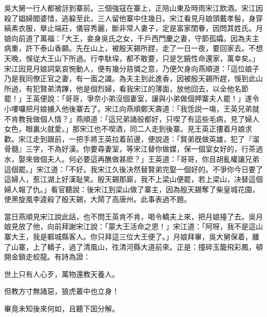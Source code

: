 吳大舅一行人都被㧱到寨前。三個強寇在寨上，正陪山東及時雨宋江飲酒。宋江因殺了娼婦閻婆惜，逃躱至此，三人留他寨中住幾日。宋江看見月娘頭戴孝髻，身穿縞素衣服，擧止端莊，儀容秀麗，斷非常人妻子，定是富家閨眷，因問其姓氏。月娘向前道了萬福：「大王，妾身吳氏之女，千戶西門慶之妻，守節孤孀。因為夫主病重，許下泰山香願。先在山上，被殷天錫所趕，走了一日一夜，要回家去。不想天晚，悞従大王山下所過。行李馱垜，都不敢要，只是乞饒性命還家，萬幸矣。」宋江因見月娘詞氣哀惋動人，便有幾分慈憐之意，乃便欠身向燕順道：「這位娘子乃是我同僚正官之妻，有一面之識。為夫主到此進香，因被殷天錫所趕，悞到此山所過，有犯賢弟清蹕，他是個烈婦，看我宋江的薄面，放他回去，以全他名節罷！」王英便說：「哥哥，爭奈小弟沒個妻室，讓與小弟做個押寨夫人罷！」遂令小嘍囉把月娘擄入他後寨去了。宋江向燕順鄭天壽道：「我恁説一塲，王英兄弟就不肯教我做個人情？」燕順道：「這兄弟諸般都好，只喫了有這些毛病，見了婦人女色，眼裏火就愛。」那宋江也不喫酒，同二人走到後寨。見王英正摟着月娘求歡。宋江走到跟前，一把手將王英拉着前邊，便說道：「賢弟旣做英雄，犯了『溜骨髓』三字，不為好漢。你要尋妻室，等宋江替你做媒，保一個室女好的，行茶過水，娶來做個夫人。何必要這再醮做甚麽？」王英道：「哥哥，你且胡亂權讓兄弟這個罷。」宋江道：「不好。我宋江久後决然替賢弟完娶一個好的。不爭你今日要了這婦人，惹江湖上好漢耻笑。殷天錫那廝，我不上梁山便罷，若上梁山，决替這個婦人報了仇。」看官聽說：後宋江到梁山做了寨主，因為殷天錫奪了柴皇城花園，使黑旋風李逵殺了殷天錫，大鬧了高唐州。此事表過不題。

當日燕順見宋江說此話，也不問王英肯不肯，喝令轎夫上來，把月娘擡了去。吳月娘見放了他，向前拜謝宋江說：「蒙大王活命之恩！」宋江道：「阿呀，我不是這山寨大王，我是鄆城縣客人。你只拜這三位大王便了。」月娘拜畢，吳大舅保着，離了山寨，上了轎子，過了清風山，徃清河縣大道前來。正是：撞碎玉籠飛彩鳳，頓開金鎖走蛟龍。有詩為證：

\begin{myquote}
世上只有人心歹，萬物還教天養人。

但教方寸無諸惡，狼虎叢中也立身！
\end{myquote}

畢竟未知後來何如，且聽下囬分解。

